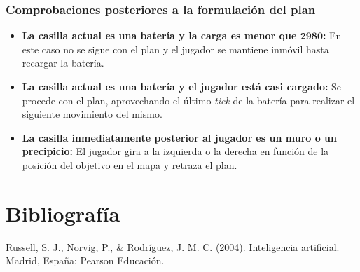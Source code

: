 \subsubsection{Comprobaciones posteriores a la formulación del plan}

\begin{itemize}
	\item\textbf{La casilla actual es una batería y la carga es menor que $\boldsymbol{2980}$:} En este caso no se sigue con el plan y el jugador se mantiene inmóvil hasta recargar la batería.
	\item\textbf{La casilla actual es una batería y el jugador está casi cargado:} Se procede con el plan, aprovechando el último \textit{tick} de la batería para realizar el siguiente movimiento del mismo.
	\item\textbf{La casilla inmediatamente posterior al jugador es un muro o un precipicio:} El jugador gira a la izquierda o la derecha en función de la posición del objetivo en el mapa y retraza el plan.
\end{itemize}

\section{Bibliografía}

Russell, S. J., Norvig, P., \& Rodríguez, J. M. C. (2004). Inteligencia artificial. Madrid, España: Pearson Educación.
